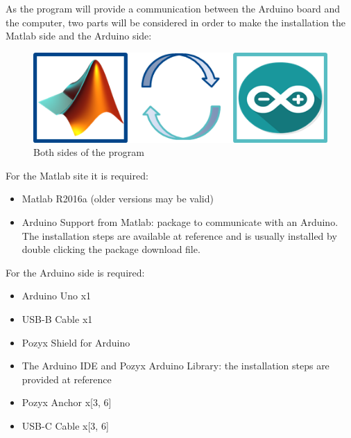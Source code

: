\documentclass[a4paper, 21pt]{article} %
\begin{document}
As the program will provide a communication between the Arduino board and the computer, two parts will be considered in order to make the installation the Matlab side and the Arduino side:\\
\begin{figure}[!hbbp]
\begin{center}
\includegraphics[scale=0.8]{fig/matlab_arduino.png}
\end{center}
\caption{Both sides of the program}
\end{figure}

For the Matlab site it is required:
\begin{itemize}
\item Matlab R2016a (older versions may be valid)
\item Arduino Support from Matlab: package to communicate with an Arduino. The installation steps are available at reference \cite{Matlab:Arduino} and is usually installed by double clicking the package download file.
\end{itemize}

For the Arduino side is required:
\begin{itemize}
\item Arduino Uno x1
\item USB-B Cable x1
\item Pozyx Shield for Arduino
\item  The Arduino IDE and Pozyx Arduino Library: the installation steps are provided at reference \cite{Arduino:Started}
\item Pozyx Anchor x[3, 6]
\item  USB-C Cable x[3, 6]
\end{itemize}
\end{document}
